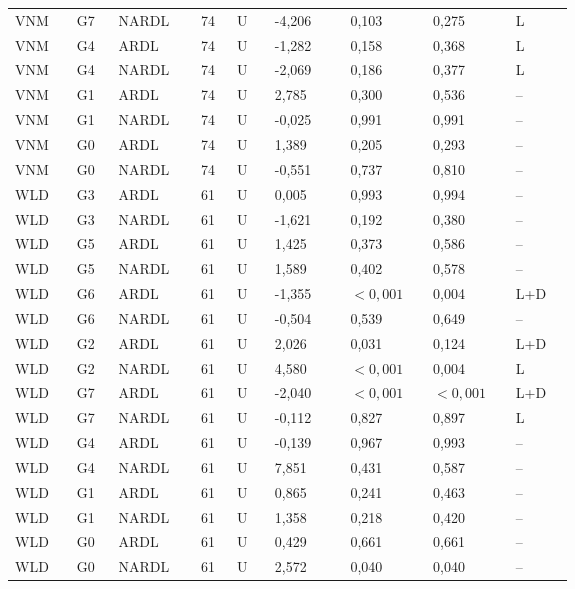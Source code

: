 {\begin{longtable}{p{0.075\linewidth}p{0.05\linewidth}p{0.09\linewidth}p{0.04\linewidth}p{0.05\linewidth}p{0.1\linewidth}p{0.085\linewidth}p{0.085\linewidth}p{0.075\linewidth}}
VNM & G7 & NARDL & 74 & U & -4,206 & 0,103 & 0,275 & L\\
VNM & G4 & ARDL & 74 & U & -1,282 & 0,158 & 0,368 & L\\
VNM & G4 & NARDL & 74 & U & -2,069 & 0,186 & 0,377 & L\\
VNM & G1 & ARDL & 74 & U & 2,785 & 0,300 & 0,536 & --\\
VNM & G1 & NARDL & 74 & U & -0,025 & 0,991 & 0,991 & --\\
VNM & G0 & ARDL & 74 & U & 1,389 & 0,205 & 0,293 & --\\
VNM & G0 & NARDL & 74 & U & -0,551 & 0,737 & 0,810 & --\\
WLD & G3 & ARDL & 61 & U & 0,005 & 0,993 & 0,994 & --\\
WLD & G3 & NARDL & 61 & U & -1,621 & 0,192 & 0,380 & --\\
WLD & G5 & ARDL & 61 & U & 1,425 & 0,373 & 0,586 & --\\
WLD & G5 & NARDL & 61 & U & 1,589 & 0,402 & 0,578 & --\\
WLD & G6 & ARDL & 61 & U & -1,355 & \(<0{,}001\) & 0,004 & L+D\\
WLD & G6 & NARDL & 61 & U & -0,504 & 0,539 & 0,649 & --\\
WLD & G2 & ARDL & 61 & U & 2,026 & 0,031 & 0,124 & L+D\\
WLD & G2 & NARDL & 61 & U & 4,580 & \(<0{,}001\) & 0,004 & L\\
WLD & G7 & ARDL & 61 & U & -2,040 & \(<0{,}001\) & \(<0{,}001\) & L+D\\
WLD & G7 & NARDL & 61 & U & -0,112 & 0,827 & 0,897 & L\\
WLD & G4 & ARDL & 61 & U & -0,139 & 0,967 & 0,993 & --\\
WLD & G4 & NARDL & 61 & U & 7,851 & 0,431 & 0,587 & --\\
WLD & G1 & ARDL & 61 & U & 0,865 & 0,241 & 0,463 & --\\
WLD & G1 & NARDL & 61 & U & 1,358 & 0,218 & 0,420 & --\\
WLD & G0 & ARDL & 61 & U & 0,429 & 0,661 & 0,661 & --\\
WLD & G0 & NARDL & 61 & U & 2,572 & 0,040 & 0,040 & --\\
\end{longtable}
}